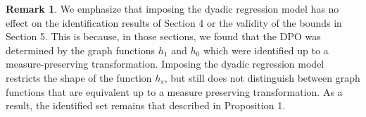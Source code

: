 \documentclass[12pt]{article}
\theoremstyle{definition}
\newtheorem{remark}{Remark}
\begin{document}
\begin{remark}
We emphasize that imposing the dyadic regression model has no effect on the identification results of Section 4 or the validity of the bounds in Section 5. This is because, in those sections, we found that the DPO was determined by the graph functions $h_1$ and $h_0$ which were identified up to a measure-preserving transformation. Imposing the dyadic regression model restricts the shape of the function $h_s$, but still does not distinguish between graph functions  that are equivalent up to a measure preserving transformation. As a result, the identified set remains that described in Proposition 1.  
\end{remark}




\end{document}
